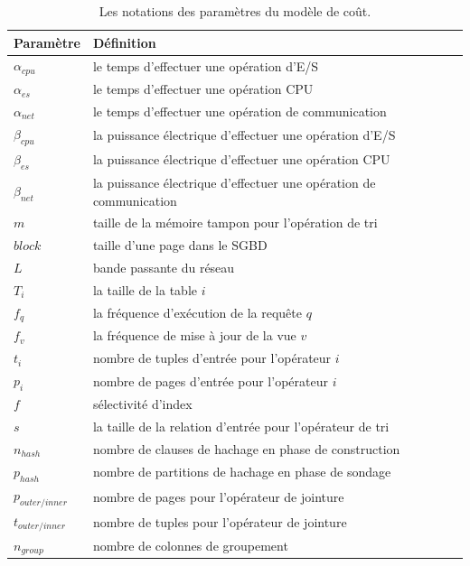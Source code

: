\begin{table}
\caption {Les notations des paramètres du modèle de coût.} \label{tab:cost-param}
\centering
    \begin{tabular}{ll}
    \toprule
    \textbf{Paramètre} & \textbf{Définition} \\ \midrule
    $\alpha_{cpu}$ & le temps d'effectuer une opération d'E/S \\
    $\alpha_{es}$ & le temps d'effectuer une opération CPU \\
    $\alpha_{net}$ & le temps d'effectuer une opération de communication \\
    $\beta_{cpu}$ & la puissance électrique d'effectuer une opération d'E/S \\
    $\beta_{es}$ & la puissance électrique d'effectuer une opération CPU \\
    $\beta_{net}$ & la puissance électrique d'effectuer une opération de communication \\
    \midrule
	$m$ & taille de la mémoire tampon pour l'opération de tri \\
	$block$ & taille d'une page dans le SGBD \\
	$L$ & bande passante du réseau \\
	$T_i$ & la taille de la table $i$ \\
	$f_q$ & la fréquence d'exécution de la requête $q$ \\
	$f_v$ & la fréquence de mise à jour de la vue $v$ \\
	\midrule
    $t_i$ & nombre de tuples d'entrée pour l'opérateur $i$ \\
    $p_i$ & nombre de pages d'entrée pour l'opérateur $i$ \\
    $f$ & sélectivité d'index \\
    $s$ & la taille de la relation d'entrée pour l'opérateur de tri \\
    $n_{hash}$ & nombre de clauses de hachage en phase de construction \\
    $p_{hash}$ & nombre de partitions de hachage en phase de sondage \\
    $p_{outer/inner}$ & nombre de pages pour l'opérateur de jointure \\
    $t_{outer/inner}$ & nombre de tuples pour l'opérateur de jointure \\
    $n_{group}$ & nombre de colonnes de groupement \\ \bottomrule
    \end{tabular}
\end{table}


